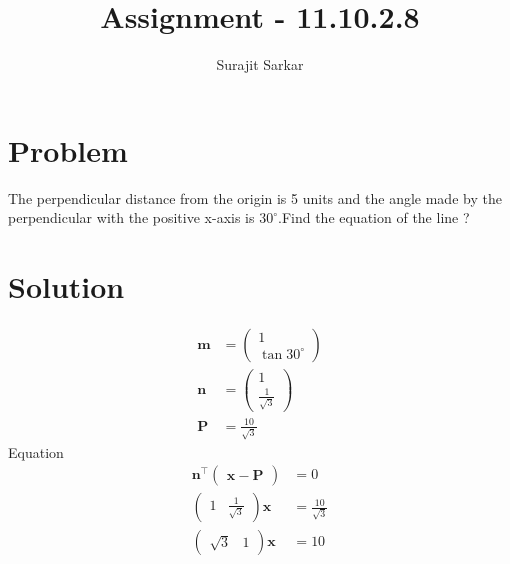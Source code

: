 \documentclass[journal,12pt,twocolumn]{IEEEtran}
\title{\mytitle}
\title{
Assignment - 11.10.2.8
}
\author{Surajit Sarkar}
\newcommand{\myvec}[1]{\ensuremath{\begin{pmatrix}#1\end{pmatrix}}}
\let\vec\mathbf
\begin{document}
\maketitle
\tableofcontents
\bigskip
\section{\textbf{Problem}}
The perpendicular distance from the origin is 5 units and the angle made by the perpendicular with the positive x-axis is $30^{\circ}$.Find the equation of the line ?
\section{\textbf{Solution}}
\begin{align}
\vec{m}&=\myvec{1\\\tan30^{\circ}}\\
\vec{n}&=\myvec{1\\\frac{1}{\sqrt{3}}}\\
\vec{P}&=\frac{10}{\sqrt{3}}
\end{align}
Equation
\begin{align}
    \vec{n}^{\top}\myvec{\vec{x}-\vec{P}}&=0\\
    \myvec{1&\frac{1}{\sqrt{3}}}\vec{x}&=\frac{10}{\sqrt{3}}\\
    \myvec{\sqrt{3}&1}\vec{x}&=10
\end{align}
\end{document}
